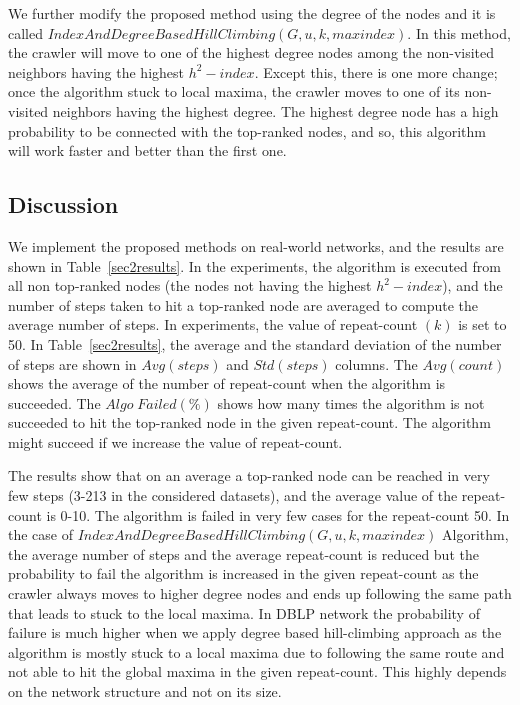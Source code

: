 \documentclass[conference]{IEEEtran}
\begin{document}
We further modify the proposed method using the degree of the nodes and it is called $IndexAndDegreeBasedHillClimbing(G,u,k,maxindex)$. In this method, the crawler will move to one of the highest degree nodes among the non-visited neighbors having the highest $h^2-index$. Except this, there is one more change; once the algorithm stuck to local maxima, the crawler moves to one of its non-visited neighbors having the highest degree. The highest degree node has a high probability to be connected with the top-ranked nodes, and so, this algorithm will work faster and better than the first one.



\subsection*{Discussion}

We implement the proposed methods on real-world networks, and the results are shown in Table~\ref{sec2results}. In the experiments, the algorithm is executed from all non top-ranked nodes (the nodes not having the highest $h^2-index$), and the number of steps taken to hit a top-ranked node are averaged to compute the average number of steps. In experiments, the value of repeat-count $(k)$ is set to 50. In Table~\ref{sec2results}, the average and the standard deviation of the number of steps are shown in $Avg(steps)$ and $Std(steps)$ columns. The $Avg(count)$ shows the average of the number of repeat-count when the algorithm is succeeded. The $Algo\;Failed(\%)$ shows how many times the algorithm is not succeeded to hit the top-ranked node in the given repeat-count. The algorithm might succeed if we increase the value of repeat-count. %

The results show that on an average a top-ranked node can be reached in very few steps (3-213 in the considered datasets), and the average value of the repeat-count is 0-10. The algorithm is failed in very few cases for the repeat-count 50. In the case of $IndexAndDegreeBasedHillClimbing(G,u,k,maxindex)$ Algorithm, the average number of steps and the average repeat-count is reduced but the probability to fail the algorithm is increased in the given repeat-count as the crawler always moves to higher degree nodes and ends up following the same path that leads to stuck to the local maxima. In DBLP network the probability of failure is much higher when we apply degree based hill-climbing approach as the algorithm is mostly stuck to a local maxima due to following the same route and not able to hit the global maxima in the given repeat-count. This highly depends on the network structure and not on its size.
\end{document}
